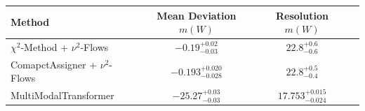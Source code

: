     \begin{tabular}{lccc}
        \toprule
        Method & Mean Deviation $m(W)$ & Resolution $m(W)$ \\
        \midrule
        $\chi^2$-Method + $\nu^2$-Flows & $-0.19^{+0.02}_{-0.03}$ & $22.8^{+0.6}_{-0.6}$ \\
        ComapctAssigner + $\nu^2$-Flows & $-0.193^{+0.020}_{-0.028}$ & $22.8^{+0.5}_{-0.4}$ \\
        MultiModalTransformer & $-25.27^{+0.03}_{-0.03}$ & $17.753^{+0.015}_{-0.024}$ \\
        \bottomrule
    \end{tabular}